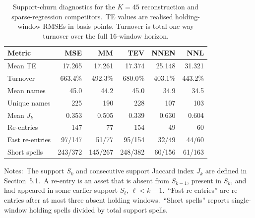 \documentclass[11pt]{article}
\begin{document}
\begin{table}[htbp]
\centering
\caption{Support-churn diagnostics for the \(K=45\) reconstruction and sparse-regression competitors.\ TE values are realised holding-window RMSEs in basis points. Turnover is total one-way turnover over the full 16-window horizon.}
\label{tab:support_churn_competitors_vertical}
\scriptsize
\begin{tabular}{lrrrrr}
\toprule
Metric 
& MSE
& MM
& TEV
& NNEN
& NNL \\
\midrule
Mean TE          & 17.265  & 17.261  & 17.374  & 25.148  & 31.321 \\
Turnover         & 663.4\% & 492.3\% & 680.0\% & 403.1\% & 443.2\% \\
Mean names       & 45.0    & 44.2    & 45.0    & 34.9    & 34.5 \\
Unique names     & 225     & 190     & 228     & 107     & 103 \\
Mean \(J_k\)     & 0.353   & 0.505   & 0.339   & 0.630   & 0.604 \\
Re-entries       & 147     & 77      & 154     & 49      & 60 \\
Fast re-entries  & 97/147  & 51/77   & 95/154  & 32/49   & 44/60 \\
Short spells     & 243/372 & 145/267 & 248/382 & 60/156  & 61/163 \\
\bottomrule
\end{tabular}
\begin{flushleft}
\footnotesize
Notes:\ The support \(S_k\) and consecutive support Jaccard index \(J_k\) are defined in Section~5.1.\
A re-entry is an asset that is absent from \(S_{k-1}\), present in \(S_k\), 
and had appeared in some earlier support 
\(S_\ell\), \(\ell<k-1\).\ 
``Fast re-entries'' are re-entries after at most three absent holding windows.\ 
``Short spells'' reports single-window holding spells divided by total support spells.
\end{flushleft}
\end{table}

\end{document}
